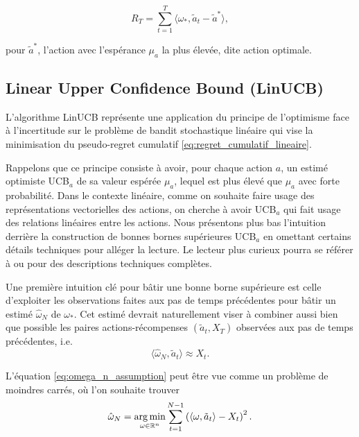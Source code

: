\begin{equation}
    R_T = \sum_{t=1}^T  \langle \omega_*, \tilde{a}_t - \tilde{a}^*\rangle,
    \label{eq:regret_cumulatif_lineaire}
\end{equation}

pour $\tilde{a}^*$, l'action avec l'espérance $\mu_a$ la plus élevée, dite action optimale.

\subsection{Linear Upper Confidence Bound (LinUCB)}
\label{subsec:pr_linucb}

L'algorithme LinUCB \citep{chu2011contextual} représente une application 
du principe de l'optimisme face à l'incertitude sur le problème de bandit stochastique linéaire
qui vise la minimisation du pseudo-regret cumulatif \eqref{eq:regret_cumulatif_lineaire}.

Rappelons que ce principe consiste à avoir, pour chaque action $a$, un estimé optimiste UCB$_a$
de sa valeur espérée $\mu_a$, lequel est plus élevé que $\mu_a$ avec forte probabilité.
Dans le contexte linéaire, comme on souhaite faire usage des représentations vectorielles 
des actions, on cherche à avoir UCB$_a$ qui fait usage des relations linéaires entre les 
actions.
Nous présentons plus bas l'intuition derrière la construction de bonnes bornes supérieures
UCB$_a$ en omettant certains détails techniques pour alléger la lecture.
Le lecteur plus curieux pourra se référer à \citet{chu2011contextual} ou \citet{abbasi2011improved}
pour des descriptions techniques complètes.

Une première intuition clé pour bâtir une bonne borne supérieure est celle d'exploiter 
les observations faites aux pas de temps précédentes pour bâtir un estimé $\hat{\omega}_N$ de 
$\omega_*$.
Cet estimé devrait naturellement viser 
à combiner aussi bien que possible les paires actions-récompenses $(\tilde{a}_t, X_T)$
observées aux pas de temps précédentes, i.e.
\begin{equation}
    \langle \hat{\omega}_N, \tilde{a}_t\rangle \approx X_t.    
    \label{eq:omega_n_assumption}
\end{equation}

L'équation \eqref{eq:omega_n_assumption} peut être vue comme un problème 
de moindres carrés, où l'on souhaite trouver
\begin{equation}
    \hat{\omega}_N = \operatorname*{arg\,min}_{\omega \in \mathbb{R}^n} \sum_{t=1}^{N-1} \left( \langle \omega, \tilde{a}_{t} \rangle - X_t \right)^2.
    \label{eq:lstsq}
\end{equation}

